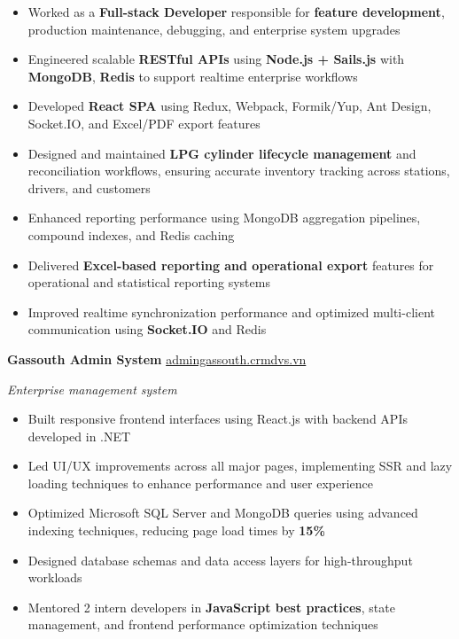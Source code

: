 \documentclass[11pt,a4paper]{article}
\begin{document}
\begin{itemize}

\item Worked as a \textbf{Full-stack Developer} responsible for \textbf{feature development}, production maintenance, debugging, and enterprise system upgrades

\item Engineered scalable \textbf{RESTful APIs} using \textbf{Node.js + Sails.js} with \textbf{MongoDB}, \textbf{Redis} to support realtime enterprise workflows

\item Developed \textbf{React SPA} using Redux, Webpack, Formik/Yup, Ant Design, Socket.IO, and Excel/PDF export features

\item Designed and maintained \textbf{LPG cylinder lifecycle management} and reconciliation workflows, ensuring accurate inventory tracking across stations, drivers, and customers

\item Enhanced reporting performance using MongoDB aggregation pipelines, compound indexes, and Redis caching

\item Delivered \textbf{Excel-based reporting and operational export} features for operational and statistical reporting systems

\item Improved realtime synchronization performance and optimized multi-client communication using \textbf{Socket.IO} and Redis


\end{itemize}
\vspace{4pt}

\textbf{Gassouth Admin System}
\hfill
{\small\color{muted}\href{https://admingassouth.crmdvs.vn/}{admingassouth.crmdvs.vn}}

{\small\color{muted}\textit{Enterprise management system}}

\begin{itemize}

\item Built responsive frontend interfaces using React.js with backend APIs developed in .NET

\item Led UI/UX improvements across all major pages, implementing SSR and lazy loading techniques to enhance performance and user experience

\item Optimized Microsoft SQL Server and MongoDB queries using advanced indexing techniques, reducing page load times by \textbf{15\%}

\item Designed database schemas and data access layers for high-throughput workloads

\item Mentored 2 intern developers in \textbf{JavaScript best practices}, state management, and frontend performance optimization techniques

\end{itemize}
\end{document}
